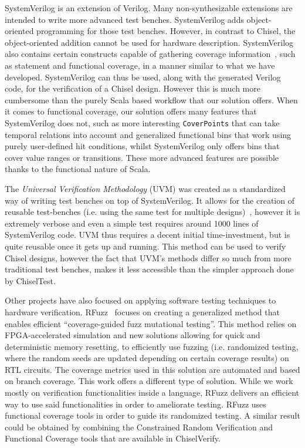 \documentclass[conference]{IEEEtran}
\begin{document}
SystemVerilog is an extension of Verilog. Many non-synthesizable extensions are intended
to write more advanced test benches. SystemVerilog adds object-oriented programming
for those test benches. However, in contrast to Chisel, the object-oriented addition cannot be
used for hardware description.
SystemVerilog also contains certain constructs capable of gathering coverage information~\cite{spear2008systemverilog}, such as statement and functional coverage, in a manner similar to what we have developed. SystemVerilog can thus be used, along with the generated Verilog code, for the verification of a Chisel design. However this is much more cumbersome than the purely Scala based workflow that our solution offers. When it comes to functional coverage, our solution offers many features that SystemVerilog does not, such as more interesting \texttt{CoverPoints} that can take temporal relations into account and generalized functional bins that work using purely user-defined hit conditions, whilst SystemVerilog only offers bins that cover value ranges or transitions. These more advanced features are possible thanks to the functional nature of Scala. 

The \textit{Universal Verification Methodology} (UVM) was created as a standardized way of writing test benches on top of SystemVerilog. It allows for the creation of reusable test-benches (i.e. using the same test for multiple designs)~\cite{uvm2015}, however it is extremely verbose and even a simple test requires around 1000 lines of SystemVerilog code. UVM thus requires a decent initial time-investment, but is quite reusable once it gets up and running. This method can be used to verify Chisel designs, however the fact that UVM's methods differ so much from more traditional test benches, makes it less accessible than the simpler approach done by ChiselTest.

Other projects have also focused on applying software testing techniques to hardware verification. RFuzz~\cite{rfuzz2018} focuses on creating a generalized method that enables efficient ``coverage-guided fuzz mutational testing''. This method relies on FPGA-accelerated simulation and new solutions allowing for quick and deterministic memory resetting, to efficiently use fuzzing (i.e. randomized testing, where the random seeds are updated depending on certain coverage results) on RTL circuits. The coverage metrics used in this solution are automated and based on branch coverage. This work offers a different type of solution. While we work mostly on verification functionalities inside a language, RFuzz delivers an efficient way to use said functionalities in order to ameliorate testing. RFuzz uses functional coverage tools in order to guide its randomized testing. A similar result could be obtained by combining the Constrained Random Verification and Functional Coverage tools that are available in ChiselVerify.
\end{document}
